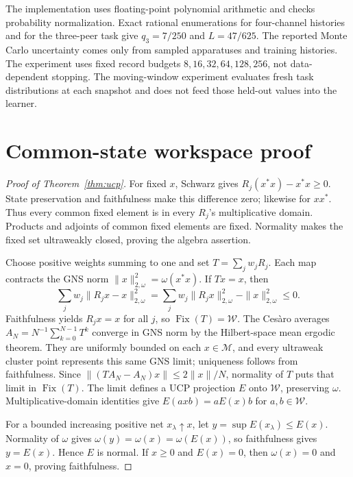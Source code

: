 \documentclass[11pt]{article}
\theoremstyle{definition}
\theoremstyle{remark}
\newcommand{\W}{\mathcal W}
\newcommand{\M}{\mathcal M}
\newcommand{\Fix}{\operatorname{Fix}}
\begin{document}
The implementation uses floating-point polynomial arithmetic and checks probability normalization. Exact rational enumerations for four-channel histories and for the three-peer task give $q_3=7/250$ and $L=47/625$. The reported Monte Carlo uncertainty comes only from sampled apparatuses and training histories. The experiment uses fixed record budgets $8,16,32,64,128,256$, not data-dependent stopping. The moving-window experiment evaluates fresh task distributions at each snapshot and does not feed those held-out values into the learner.

\section{Common-state workspace proof}
\label{app:workspace-proof}

\begin{proof}[Proof of Theorem~\ref{thm:ucp}]
For fixed $x$, Schwarz gives $R_j(x^*x)-x^*x\ge0$. State preservation and faithfulness make this difference zero; likewise for $xx^*$. Thus every common fixed element is in every $R_j$'s multiplicative domain. Products and adjoints of common fixed elements are fixed. Normality makes the fixed set ultraweakly closed, proving the algebra assertion.

Choose positive weights summing to one and set $T=\sum_jw_jR_j$. Each map contracts the GNS norm $\|x\|_{2,\omega}^2=\omega(x^*x)$. If $Tx=x$, then
\begin{equation}
 \sum_jw_j\|R_jx-x\|_{2,\omega}^2
 =\sum_jw_j\|R_jx\|_{2,\omega}^2-\|x\|_{2,\omega}^2\le0.
\end{equation}
Faithfulness yields $R_jx=x$ for all $j$, so $\Fix(T)=\W$. The Cesàro averages $A_N=N^{-1}\sum_{k=0}^{N-1}T^k$ converge in GNS norm by the Hilbert-space mean ergodic theorem. They are uniformly bounded on each $x\in\M$, and every ultraweak cluster point represents this same GNS limit; uniqueness follows from faithfulness. Since $\|(TA_N-A_N)x\|\le2\|x\|/N$, normality of $T$ puts that limit in $\Fix(T)$. The limit defines a UCP projection $E$ onto $\W$, preserving $\omega$. Multiplicative-domain identities give $E(axb)=aE(x)b$ for $a,b\in\W$.

For a bounded increasing positive net $x_\lambda\uparrow x$, let $y=\sup E(x_\lambda)\le E(x)$. Normality of $\omega$ gives $\omega(y)=\omega(x)=\omega(E(x))$, so faithfulness gives $y=E(x)$. Hence $E$ is normal. If $x\ge0$ and $E(x)=0$, then $\omega(x)=0$ and $x=0$, proving faithfulness.
\end{proof}
\end{document}
